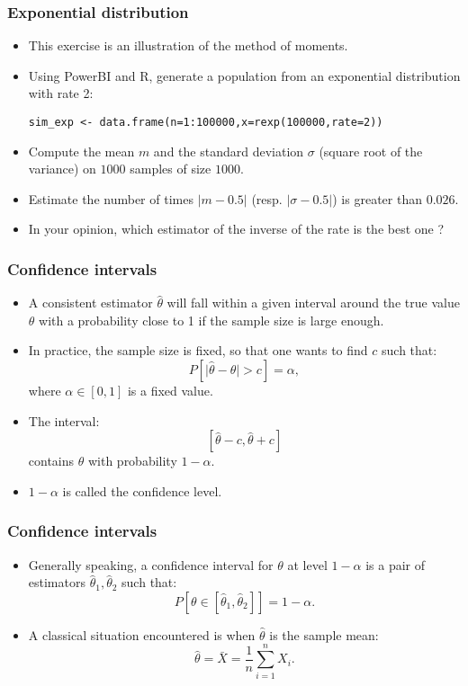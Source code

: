 \documentclass[main.tex]{subfiles}
\begin{document}
\begin{frame}[fragile]
    \frametitle{Exponential distribution}
    \begin{itemize}
        \item<+-> This exercise is an illustration of the method of moments.
        \item<+-> Using PowerBI and R, generate a population from an exponential distribution with rate 2:
{\footnotesize
\begin{verbatim}
sim_exp <- data.frame(n=1:100000,x=rexp(100000,rate=2))
\end{verbatim}}
        \item<+-> Compute the mean $m$ and the standard deviation $\sigma$ (square root of the variance) on $1000$ samples of size $1000$.
        \item<+-> Estimate the number of times $\lvert m - 0.5 \rvert$ (resp. $\lvert \sigma - 0.5 \rvert$) is greater than $0.026.$
        \item<+-> In your opinion, which estimator of the inverse of the rate is the best one ?
    \end{itemize}
\end{frame}

\begin{frame}
    \frametitle{Confidence intervals}
    \begin{itemize}
        \item<+-> A consistent estimator $\hat{\theta}$ will fall within a given interval around the true value $\theta$ with a probability close to 1
        if the sample size is large enough.
        \item<+-> In practice, the sample size is fixed, so that one wants to find $c$ such that:
        \begin{equation}
            P\left[ \lvert \hat{\theta} - \theta \rvert > c \right] = \alpha,
        \end{equation}
        where $\alpha \in [0,1]$ is a fixed value.
        \item<+-> The interval:
        \[
        \left[ \hat{\theta}-c, \hat{\theta} + c \right]
        \]
        contains $\theta$ with probability $1- \alpha.$
        \item<+-> $1-\alpha$ is called the confidence level.
    \end{itemize}
\end{frame}

\begin{frame}
    \frametitle{Confidence intervals}
    \begin{itemize}
        \item<+-> Generally speaking, a confidence interval for $\theta$ at level $1-\alpha$ is a pair of estimators $\hat{\theta}_1, \hat{\theta}_2$ 
        such that:
        \[
        P\left[\theta \in  \left[ \hat{\theta}_1, \hat{\theta}_2\right] \right] = 1-\alpha.
        \]
        \item<+-> A classical situation encountered is when $\hat{\theta}$ is the sample mean:
        \[
        \hat{\theta} = \bar{X} = \frac{1}{n} \sum_{i=1}^n X_i.
        \]
    \end{itemize}
\end{frame}
\end{document}
